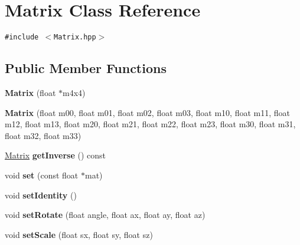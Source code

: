 \hypertarget{classm3g_1_1Matrix}{
\section{Matrix Class Reference}
\label{classm3g_1_1Matrix}
}
{\tt \#include $<$Matrix.hpp$>$}

\subsection*{Public Member Functions}
\begin{CompactItemize}
\item 
\hypertarget{classm3g_1_1Matrix_04fd433badb74a2d60395217701d4009}{
\textbf{Matrix} (float $\ast$m4x4)}
\label{classm3g_1_1Matrix_04fd433badb74a2d60395217701d4009}

\item 
\hypertarget{classm3g_1_1Matrix_2c2f600f3a4c1db4a0da0b57db8aebca}{
\textbf{Matrix} (float m00, float m01, float m02, float m03, float m10, float m11, float m12, float m13, float m20, float m21, float m22, float m23, float m30, float m31, float m32, float m33)}
\label{classm3g_1_1Matrix_2c2f600f3a4c1db4a0da0b57db8aebca}

\item 
\hypertarget{classm3g_1_1Matrix_b26f91cb9ae99fad922140d93b886009}{
\hyperlink{classm3g_1_1Matrix}{Matrix} \textbf{getInverse} () const }
\label{classm3g_1_1Matrix_b26f91cb9ae99fad922140d93b886009}

\item 
\hypertarget{classm3g_1_1Matrix_ed427d2cd38fe4a0b23f7f80803b7fd5}{
void \textbf{set} (const float $\ast$mat)}
\label{classm3g_1_1Matrix_ed427d2cd38fe4a0b23f7f80803b7fd5}

\item 
\hypertarget{classm3g_1_1Matrix_382e6ad7e6721b121e510959e1011be3}{
void \textbf{setIdentity} ()}
\label{classm3g_1_1Matrix_382e6ad7e6721b121e510959e1011be3}

\item 
\hypertarget{classm3g_1_1Matrix_c4e04770db1fedff14c37b5e4e4a68c6}{
void \textbf{setRotate} (float angle, float ax, float ay, float az)}
\label{classm3g_1_1Matrix_c4e04770db1fedff14c37b5e4e4a68c6}

\item 
\hypertarget{classm3g_1_1Matrix_937d04042c25021532ea2532fe5e3a32}{
void \textbf{setScale} (float sx, float sy, float sz)}
\label{classm3g_1_1Matrix_937d04042c25021532ea2532fe5e3a32}


\end{CompactItemize}
